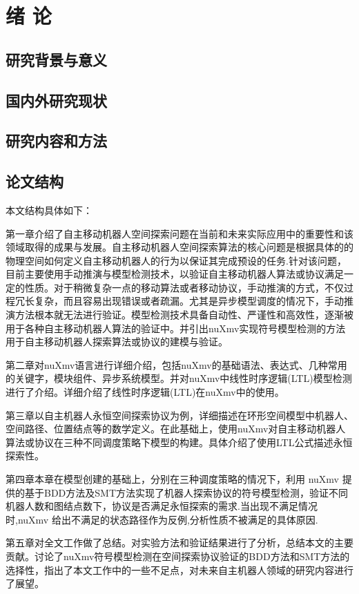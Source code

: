 \chapter{绪\hskip 0.4cm 论}


\section{研究背景与意义}


\section{国内外研究现状}


\section{研究内容和方法}


\section{论文结构}
本文结构具体如下：

第一章介绍了自主移动机器人空间探索问题在当前和未来实际应用中的重要性和该领域取得的成果与发展。自主移动机器人空间探索算法的核心问题是根据具体的的物理空间如何定义自主移动机器人的行为以保证其完成预设的任务.针对该问题，目前主要使用手动推演与模型检测技术，以验证自主移动机器人算法或协议满足一定的性质。对于稍微复杂一点的移动算法或者移动协议，手动推演的方式，不仅过程冗长复杂，而且容易出现错误或者疏漏。尤其是异步模型调度的情况下，手动推演方法根本就无法进行验证。模型检测技术具备自动性、严谨性和高效性，逐渐被用于各种自主移动机器人算法的验证中。并引出nuXmv实现符号模型检测的方法用于自主移动机器人探索算法或协议的建模与验证。

第二章对nuXmv语言进行详细介绍，包括nuXmv的基础语法、表达式、几种常用的关键字，模块组件、异步系统模型。并对nuXmv中线性时序逻辑(LTL)模型检测进行了介绍。详细介绍了线性时序逻辑(LTL)在nuXmv中的使用。

第三章以自主机器人永恒空间探索协议为例，详细描述在环形空间模型中机器人、空间路径、位置结点等的数学定义。在此基础上，使用nuXmv对自主移动机器人算法或协议在三种不同调度策略下模型的构建。具体介绍了使用LTL公式描述永恒探索性。


第四章本章在模型创建的基础上，分别在三种调度策略的情况下，利用 nuXmv 提供的基于BDD方法及SMT方法实现了机器人探索协议的符号模型检测，验证不同机器人数和图结点数下，协议是否满足永恒探索的需求.当出现不满足情况时,nuXmv 给出不满足的状态路径作为反例,分析性质不被满足的具体原因.

第五章对全文工作做了总结。对实验方法和验证结果进行了分析，总结本文的主要贡献。讨论了nuXmv符号模型检测在空间探索协议验证的BDD方法和SMT方法的选择性，指出了本文工作中的一些不足点，对未来自主机器人领域的研究内容进行了展望。



